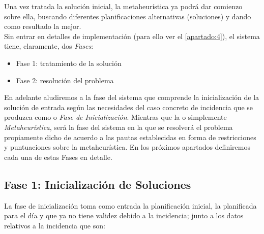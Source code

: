 Una vez tratada la solución inicial, la metaheurística ya podrá dar comienzo sobre ella, buscando diferentes 
planificaciones alternativas (soluciones) y dando como resultado la mejor. 
\\


Sin entrar en detalles de implementación (para ello ver el \autoref{apartado:4}), el sistema tiene, claramente, dos 
\textit{Fases}:
\begin{itemize}
	\item \label{Fase 1} Fase 1: tratamiento de la solución
	\item \label{Fase 2} Fase 2: resolución del problema
\end{itemize}

En adelante aludiremos a la fase del sistema que comprende la inicialización de la solución de entrada según las 
necesidades del caso concreto de incidencia que se produzca como \faseuno{} o \textit{Fase de Inicialización}. 
Mientras que la \fasedos{} o simplemente \textit{Metaheurística}, será la fase del sistema en la que se resolverá el 
problema propiamente dicho de acuerdo a las pautas establecidas en forma de restricciones y puntuaciones sobre la 
metaheurística.
En los próximos apartados definiremos cada una de estas Fases en detalle.

\subsection{Fase 1: Inicialización de Soluciones} \label{sec:3:inicializacion-soluciones}

La fase de inicialización toma como entrada la planificación inicial, la planificada para el día y que ya no tiene 
validez debido a la incidencia; junto a los datos relativos a la incidencia que son:

